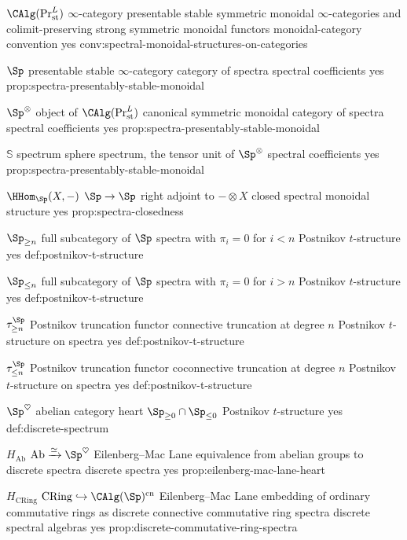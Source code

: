 \begin{longtable}
\CanonicalEntry
{\(\CAlg(\Pr^L_{\mathrm{st}})\)}
{\(\infty\)-category}
{presentable stable symmetric monoidal \(\infty\)-categories and colimit-preserving strong symmetric monoidal functors}
{monoidal-category convention}
{yes}
{conv:spectral-monoidal-structures-on-categories}

\CanonicalEntry
{\(\Sp\)}
{presentable stable \(\infty\)-category}
{category of spectra}
{spectral coefficients}
{yes}
{prop:spectra-presentably-stable-monoidal}

\CanonicalEntry
{\(\Sp^\otimes\)}
{object of \(\CAlg(\Pr^L_{\mathrm{st}})\)}
{canonical symmetric monoidal category of spectra}
{spectral coefficients}
{yes}
{prop:spectra-presentably-stable-monoidal}

\CanonicalEntry
{\(\mathbb S\)}
{spectrum}
{sphere spectrum, the tensor unit of \(\Sp^\otimes\)}
{spectral coefficients}
{yes}
{prop:spectra-presentably-stable-monoidal}

\CanonicalEntry
{\(\HHom_{\Sp}(X,-)\)}
{\(\Sp\to\Sp\)}
{right adjoint to \(-\otimes X\)}
{closed spectral monoidal structure}
{yes}
{prop:spectra-closedness}

\CanonicalEntry
{\(\Sp_{\geq n}\)}
{full subcategory of \(\Sp\)}
{spectra with \(\pi_i=0\) for \(i<n\)}
{Postnikov \(t\)-structure}
{yes}
{def:postnikov-t-structure}

\CanonicalEntry
{\(\Sp_{\leq n}\)}
{full subcategory of \(\Sp\)}
{spectra with \(\pi_i=0\) for \(i>n\)}
{Postnikov \(t\)-structure}
{yes}
{def:postnikov-t-structure}

\CanonicalEntry
{\(\tau_{\geq n}^{\Sp}\)}
{Postnikov truncation functor}
{connective truncation at degree \(n\)}
{Postnikov \(t\)-structure on spectra}
{yes}
{def:postnikov-t-structure}

\CanonicalEntry
{\(\tau_{\leq n}^{\Sp}\)}
{Postnikov truncation functor}
{coconnective truncation at degree \(n\)}
{Postnikov \(t\)-structure on spectra}
{yes}
{def:postnikov-t-structure}

\CanonicalEntry
{\(\Sp^\heartsuit\)}
{abelian category}
{heart \(\Sp_{\geq0}\cap\Sp_{\leq0}\)}
{Postnikov \(t\)-structure}
{yes}
{def:discrete-spectrum}

\CanonicalEntry
{\(H_{\mathrm{Ab}}\)}
{\(\operatorname{Ab}\xrightarrow{\simeq}\Sp^\heartsuit\)}
{Eilenberg--Mac Lane equivalence from abelian groups to discrete spectra}
{discrete spectra}
{yes}
{prop:eilenberg-mac-lane-heart}

\CanonicalEntry
{\(H_{\mathrm{CRing}}\)}
{\(\operatorname{CRing}\hookrightarrow\CAlg(\Sp)^{\mathrm{cn}}\)}
{Eilenberg--Mac Lane embedding of ordinary commutative rings as discrete connective commutative ring spectra}
{discrete spectral algebras}
{yes}
{prop:discrete-commutative-ring-spectra}


\end{longtable}
